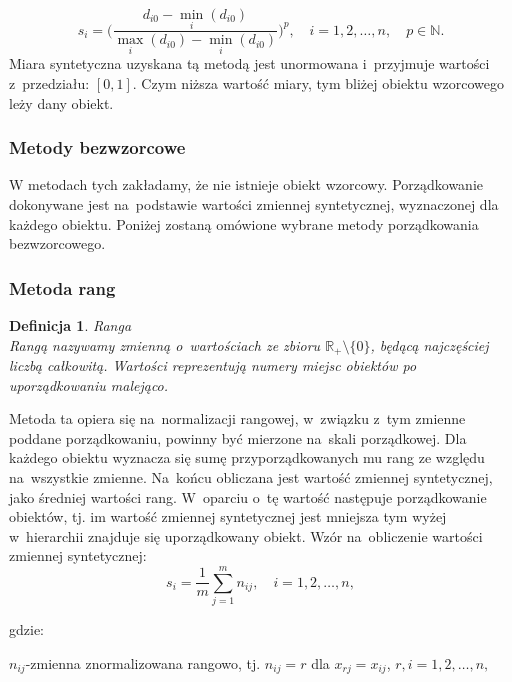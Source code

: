 \documentclass[12pt,a4paper]{report}
\newtheorem{definition}[theorem]{Definicja}
\begin{document}
$$s_{i}=\bigg(\frac{d_{i0}-\min\limits_{i}(d_{i0})}{\max\limits_{i}(d_{i0})-\min\limits_{i}(d_{i0})} \bigg)^{p}, \quad i=1,2,\dots,n, \quad p \in \mathbb{N}.
$$
Miara syntetyczna uzyskana tą metodą jest unormowana i~przyjmuje wartości z~przedziału: $[0,1]$. Czym niższa wartość miary, tym bliżej obiektu wzorcowego leży dany obiekt. 
\subsubsection{Metody bezwzorcowe}


W metodach tych zakładamy, że nie istnieje obiekt wzorcowy. %
Porządkowanie dokonywane jest na~podstawie wartości zmiennej syntetycznej, wyznaczonej dla każdego obiektu. 
Poniżej zostaną omówione wybrane metody porządkowania bezwzorcowego.

\subsubsection{Metoda rang}

\begin{definition}{Ranga \cite[Rozdział 1.5]{panek2013}}\\
Rangą nazywamy zmienną o~wartościach ze zbioru ${\mathbb{R}_{+}\setminus{\{0\}}}$, będącą najczęściej liczbą całkowitą. Wartości reprezentują numery miejsc obiektów po uporządkowaniu malejąco.
\end{definition}
Metoda ta opiera się na~normalizacji rangowej, w~związku z~tym zmienne poddane porządkowaniu, powinny być mierzone na~skali porządkowej. Dla każdego obiektu wyznacza się sumę przyporządkowanych mu rang ze względu na~wszystkie zmienne. Na~końcu obliczana jest wartość zmiennej syntetycznej, jako średniej wartości rang. W~oparciu o~tę wartość następuje porządkowanie obiektów, tj. im wartość zmiennej syntetycznej jest mniejsza tym wyżej w~hierarchii znajduje się uporządkowany obiekt. Wzór na~obliczenie wartości zmiennej syntetycznej: 
$$
s_{i}=\frac{1}{m}\sum_{j=1}^{m} n_{ij},\quad i=1, 2, \ldots, n,
$$

gdzie:

$n_{ij}$-zmienna znormalizowana rangowo, tj. $n_{ij}=r$ dla $x_{rj}=x_{ij}$,
$r,i=1, 2, \ldots, n,$
\end{document}
